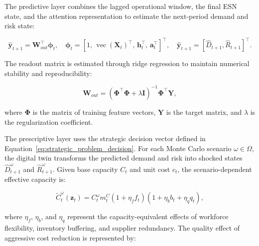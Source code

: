 \documentclass[apajournal,article,submit,pdftex,moreauthors]{Definitions/mdpi}
\begin{document}
The predictive layer combines the lagged operational window, the final ESN state, and the attention representation to estimate the next-period demand and risk state:

\begin{linenomath}
\begin{equation}
\widehat{\mathbf{y}}_{t+1}
=
\mathbf{W}_{out}^{\top}
\boldsymbol{\phi}_t,
\quad
\boldsymbol{\phi}_t
=
\left[
1,\,
\operatorname{vec}(\mathbf{X}_t)^{\top},\,
\mathbf{h}_{t}^{\top},\,
\mathbf{a}_{t}^{\top}
\right]^{\top},
\quad
\widehat{\mathbf{y}}_{t+1}
=
\left[
\widehat{D}_{t+1},
\widehat{R}_{t+1}
\right]^{\top}.
\label{eq:gatr_esn_readout}
\end{equation}
\end{linenomath}

The readout matrix is estimated through ridge regression to maintain numerical stability and reproducibility:

\begin{linenomath}
\begin{equation}
\mathbf{W}_{out}
=
\left(
\boldsymbol{\Phi}^{\top}\boldsymbol{\Phi}
+
\lambda \mathbf{I}
\right)^{-1}
\boldsymbol{\Phi}^{\top}\mathbf{Y},
\label{eq:ridge_readout}
\end{equation}
\end{linenomath}
where $\boldsymbol{\Phi}$ is the matrix of training feature vectors, $\mathbf{Y}$ is the target matrix, and $\lambda$ is the regularization coefficient.

The prescriptive layer uses the strategic decision vector defined in Equation~\eqref{eq:strategic_problem_decision}. For each Monte Carlo scenario $\omega\in\Omega$, the digital twin transforms the predicted demand and risk into shocked states $\widehat{D}_{t+1}^{\omega}$ and $\widehat{R}_{t+1}^{\omega}$. Given base capacity $C_t$ and unit cost $c_t$, the scenario-dependent effective capacity is:

\begin{linenomath}
\begin{equation}
\widetilde{C}_{t}^{\omega}(\mathbf{z}_t)
=
C_t^{\omega}m^C_t
\left(1+\eta_f f_t\right)
\left(1+\eta_b b_t+\eta_q q_t\right),
\label{eq:effective_capacity}
\end{equation}
\end{linenomath}
where $\eta_f$, $\eta_b$, and $\eta_q$ represent the capacity-equivalent effects of workforce flexibility, inventory buffering, and supplier redundancy. The quality effect of aggressive cost reduction is represented by:
\end{document}
